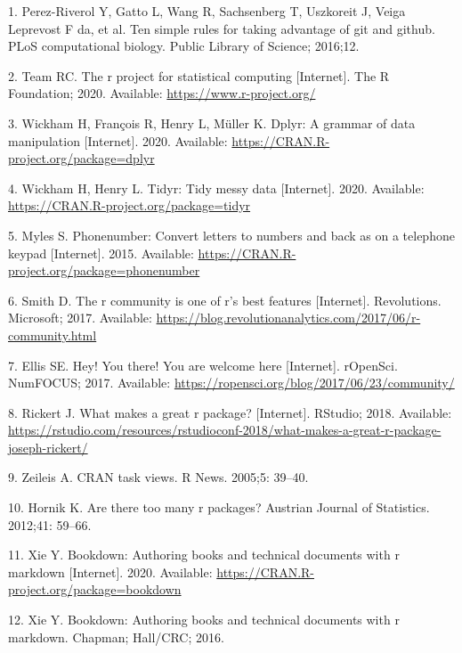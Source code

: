 \documentclass[10pt,letterpaper]{article}
\begin{document}
\hypertarget{refs}{}
\leavevmode\hypertarget{ref-perez2016}{}%
1. Perez-Riverol Y, Gatto L, Wang R, Sachsenberg T, Uszkoreit J, Veiga
Leprevost F da, et al. Ten simple rules for taking advantage of git and
github. PLoS computational biology. Public Library of Science; 2016;12.

\leavevmode\hypertarget{ref-Rproject2020}{}%
2. Team RC. The r project for statistical computing {[}Internet{]}. The
R Foundation; 2020. Available: \url{https://www.r-project.org/}

\leavevmode\hypertarget{ref-dplyr}{}%
3. Wickham H, François R, Henry L, Müller K. Dplyr: A grammar of data
manipulation {[}Internet{]}. 2020. Available:
\url{https://CRAN.R-project.org/package=dplyr}

\leavevmode\hypertarget{ref-tidyr}{}%
4. Wickham H, Henry L. Tidyr: Tidy messy data {[}Internet{]}. 2020.
Available: \url{https://CRAN.R-project.org/package=tidyr}

\leavevmode\hypertarget{ref-phonenumber}{}%
5. Myles S. Phonenumber: Convert letters to numbers and back as on a
telephone keypad {[}Internet{]}. 2015. Available:
\url{https://CRAN.R-project.org/package=phonenumber}

\leavevmode\hypertarget{ref-smith2017}{}%
6. Smith D. The r community is one of r's best features {[}Internet{]}.
Revolutions. Microsoft; 2017. Available:
\url{https://blog.revolutionanalytics.com/2017/06/r-community.html}

\leavevmode\hypertarget{ref-ellis2017}{}%
7. Ellis SE. Hey! You there! You are welcome here {[}Internet{]}.
rOpenSci. NumFOCUS; 2017. Available:
\url{https://ropensci.org/blog/2017/06/23/community/}

\leavevmode\hypertarget{ref-rickert2018}{}%
8. Rickert J. What makes a great r package? {[}Internet{]}. RStudio;
2018. Available:
\url{https://rstudio.com/resources/rstudioconf-2018/what-makes-a-great-r-package-joseph-rickert/}

\leavevmode\hypertarget{ref-zeileis2005}{}%
9. Zeileis A. CRAN task views. R News. 2005;5: 39--40.

\leavevmode\hypertarget{ref-hornik2012}{}%
10. Hornik K. Are there too many r packages? Austrian Journal of
Statistics. 2012;41: 59--66.

\leavevmode\hypertarget{ref-bookdown}{}%
11. Xie Y. Bookdown: Authoring books and technical documents with r
markdown {[}Internet{]}. 2020. Available:
\url{https://CRAN.R-project.org/package=bookdown}

\leavevmode\hypertarget{ref-xie2016}{}%
12. Xie Y. Bookdown: Authoring books and technical documents with r
markdown. Chapman; Hall/CRC; 2016.
\end{document}
